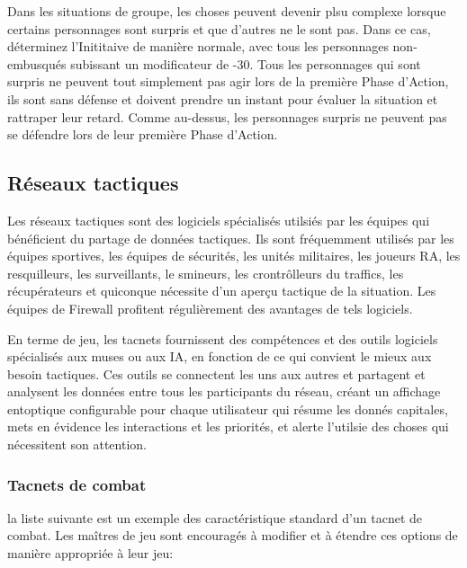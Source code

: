 Dans les situations de groupe, les choses peuvent devenir plsu complexe lorsque certains personnages sont surpris et que d'autres ne le sont pas. Dans ce cas, déterminez l'Inititaive de manière normale, avec tous les personnages non-embusqués subissant un modificateur de -30. Tous les personnages qui sont surpris ne peuvent tout simplement pas agir lors de la première Phase d'Action, ils sont sans défense et doivent prendre un instant pour évaluer la situation et rattraper leur retard. Comme au-dessus, les personnages surpris ne peuvent pas se défendre lors de leur première Phase d'Action. 



\subsection{Réseaux tactiques} \label{sec:tactical-networks} 

Les réseaux tactiques sont des logiciels spécialisés utilsiés par les équipes qui bénéficient du partage de données tactiques. Ils sont fréquemment utilisés par les équipes sportives, les équipes de sécurités, les unités militaires, les joueurs RA, les resquilleurs, les surveillants, le smineurs, les crontrôlleurs du traffics, les récupérateurs et quiconque nécessite d'un aperçu tactique de la situation. Les équipes de Firewall profitent régulièrement des avantages de tels logiciels. 

En terme de jeu, les tacnets fournissent des compétences et des outils logiciels spécialisés aux muses ou aux IA, en fonction de ce qui convient le mieux aux besoin tactiques. Ces outils se connectent les uns aux autres et partagent et analysent les données entre tous les participants du réseau, créant un affichage entoptique configurable pour chaque utilisateur qui résume les donnés capitales, mets en évidence les interactions et les priorités, et alerte l'utilsie des choses qui nécessitent son attention. 

\subsubsection{Tacnets de combat} la liste suivante est un exemple des caractéristique standard d'un tacnet de combat. Les maîtres de jeu sont encouragés à modifier et à étendre ces options de manière appropriée à leur jeu: 

